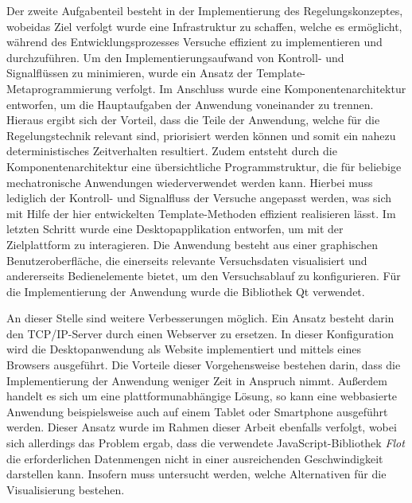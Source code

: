Der zweite Aufgabenteil besteht in der Implementierung des Regelungskonzeptes, wobeidas Ziel verfolgt wurde eine Infrastruktur zu schaffen, welche es ermöglicht, während des Entwicklungsprozesses Versuche effizient zu implementieren und durchzuführen. Um den Implementierungsaufwand von Kontroll- und Signalflüssen zu minimieren, wurde ein Ansatz der Template-Metaprogrammierung verfolgt. Im Anschluss wurde eine Komponentenarchitektur entworfen, um die Hauptaufgaben der Anwendung voneinander zu trennen. Hieraus ergibt sich der Vorteil, dass die Teile der Anwendung, welche für die Regelungstechnik relevant sind, priorisiert werden können und somit ein nahezu deterministisches Zeitverhalten resultiert. Zudem entsteht durch die Komponentenarchitektur eine übersichtliche Programmstruktur, die für beliebige mechatronische Anwendungen wiederverwendet werden kann. Hierbei muss lediglich der Kontroll- und Signalfluss der Versuche angepasst werden, was sich mit Hilfe der hier entwickelten Template-Methoden effizient realisieren lässt. Im letzten Schritt wurde eine Desktopapplikation entworfen, um mit der Zielplattform zu interagieren. Die Anwendung besteht aus einer graphischen Benutzeroberfläche, die einerseits relevante Versuchsdaten visualisiert und andererseits Bedienelemente bietet, um den Versuchsablauf zu konfigurieren. Für die Implementierung der Anwendung wurde die Bibliothek Qt verwendet.

An dieser Stelle sind weitere Verbesserungen möglich. Ein Ansatz besteht darin den TCP/IP-Server durch einen Webserver zu ersetzen. In dieser Konfiguration wird die Desktopanwendung als Website implementiert und mittels eines Browsers ausgeführt. Die Vorteile dieser Vorgehensweise bestehen darin, dass die Implementierung der Anwendung weniger Zeit in Anspruch nimmt. Außerdem handelt es sich um eine plattformunabhängige Lösung, so kann eine webbasierte Anwendung beispielsweise auch auf einem Tablet oder Smartphone ausgeführt werden. Dieser  Ansatz wurde im Rahmen dieser Arbeit ebenfalls verfolgt, wobei sich allerdings das Problem ergab, dass die verwendete JavaScript-Bibliothek \textit{Flot} die erforderlichen Datenmengen nicht in einer ausreichenden Geschwindigkeit darstellen kann. Insofern muss untersucht werden, welche Alternativen für die Visualisierung bestehen.

